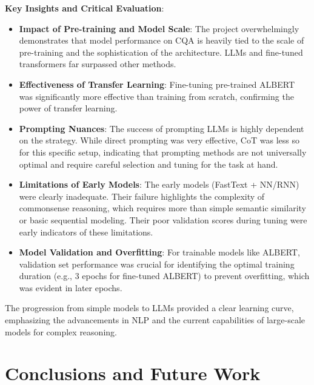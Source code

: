 \documentclass[10.5pt]{article}
\begin{document}
\textbf{Key Insights and Critical Evaluation}:
\begin{itemize}
    \item \textbf{Impact of Pre-training and Model Scale}: The project overwhelmingly demonstrates that model performance on CQA is heavily tied to the scale of pre-training and the sophistication of the architecture. LLMs and fine-tuned transformers far surpassed other methods.
    \item \textbf{Effectiveness of Transfer Learning}: Fine-tuning pre-trained ALBERT was significantly more effective than training from scratch, confirming the power of transfer learning.
    \item \textbf{Prompting Nuances}: The success of prompting LLMs is highly dependent on the strategy. While direct prompting was very effective, CoT was less so for this specific setup, indicating that prompting methods are not universally optimal and require careful selection and tuning for the task at hand.
    \item \textbf{Limitations of Early Models}: The early models (FastText + NN/RNN) were clearly inadequate. Their failure highlights the complexity of commonsense reasoning, which requires more than simple semantic similarity or basic sequential modeling. Their poor validation scores during tuning were early indicators of these limitations.
    \item \textbf{Model Validation and Overfitting}: For trainable models like ALBERT, validation set performance was crucial for identifying the optimal training duration (e.g., 3 epochs for fine-tuned ALBERT) to prevent overfitting, which was evident in later epochs.
\end{itemize}
The progression from simple models to LLMs provided a clear learning curve, emphasizing the advancements in NLP and the current capabilities of large-scale models for complex reasoning.

\newpage
\section{Conclusions and Future Work}
\end{document}
